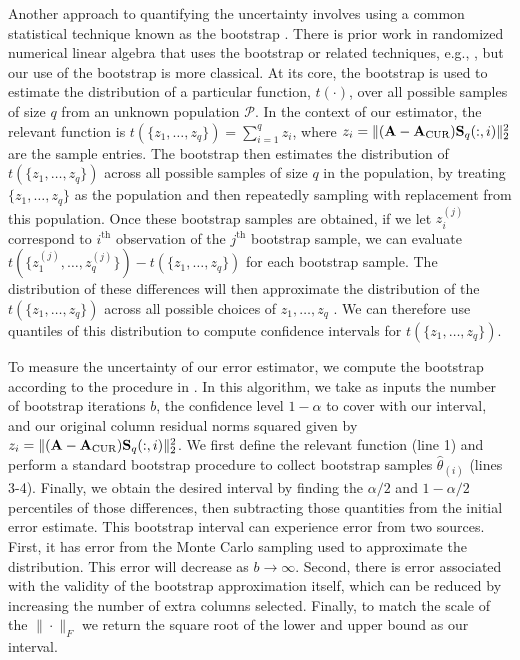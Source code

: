 \documentclass[11pt]{article}
\newcommand{\kpnote}[1]{\textit{\textcolor{violet}{KP: #1}}}
\newcommand{\llnote}[1]{\textit{\textcolor{olive}{LL: #1}}}
\newcommand{\curX}{\mathbf{A}_{\textup{CUR}}}
\begin{document}
Another approach to quantifying the uncertainty involves using a common statistical technique known as the bootstrap \cite{efron1979bootstrap}.
There is prior work in randomized numerical linear algebra that uses the bootstrap or related techniques, e.g., \cite{lopes2020error, Lopes2018Error, EpperlyTropp_VarianceEst2024, LazPearPrit26}, but our use of the bootstrap is more classical.
At its core, the bootstrap is used to estimate the distribution of a particular function, $t(\cdot)$, over all possible samples of size $q$ from an unknown population $\mathcal{P}$.
In the context of our estimator, the relevant function is  $t(\{z_1, \dots, z_q\}) = {\sum_{i=1}^q z_i}$, where $z_i = \|(\mathbf{A}-\curX) \mathbf{S}_{q}(:, i)\|_2^2$ are the sample entries.
The bootstrap then estimates the distribution of $t(\{z_1, \dots, z_q\})$ across all possible samples of size $q$  in the population, by treating $\{z_1, \dots, z_q\}$ as the population and then repeatedly sampling with replacement from this population.
Once these bootstrap samples are obtained, if we let $z_i^{(j)}$ correspond to $i^\text{th}$ observation of the $j^\text{th}$ bootstrap sample, we can evaluate $t(\{z^{(j)}_1, \dots,  z^{(j)}_q\}) - t(\{z_1, \dots, z_q\})$ for each bootstrap sample. The distribution of these differences will then approximate the distribution of the $t(\{z_1, \dots, z_q\})$ across all possible choices of $z_1, \dots, z_q$ \cite{efron1979bootstrap}. We can therefore use quantiles of this distribution to compute confidence intervals for $t(\{z_1, \dots, z_q\})$. %

To measure the uncertainty of our error estimator, we compute the bootstrap according to the procedure in .
In this algorithm, we take as inputs the number of bootstrap iterations $b$, the confidence level $1 - \alpha$ to cover with our interval, and our original column residual norms squared given by $z_i = \|(\mathbf{A}-\curX)\mathbf{S}_{q}(:, i)\|_2^2$.
We first define the relevant function (line 1) and perform a standard bootstrap procedure to collect bootstrap samples $\hat \theta_{(i)}$ (lines 3-4).
Finally, we obtain the desired interval by finding the $\alpha/2$ and $1-\alpha/2$ percentiles of those differences, then subtracting those quantities from the initial error estimate.
This bootstrap interval can experience error from two sources. First, it has error from the Monte Carlo sampling used to approximate the distribution. This error will decrease as $b \to \infty$. Second, there is error associated with the validity of the bootstrap approximation itself, which can be reduced by increasing the number of extra columns selected. Finally, to match the scale of the $\|\cdot\|_F$ we return the square root of the lower and upper bound as our interval.
\end{document}
